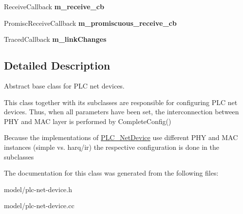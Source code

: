 \begin{DoxyCompactItemize}
\item 
\hypertarget{classns3_1_1PLC__NetDevice_a75e3b812861262923c0214944909b6ca}{\-Receive\-Callback {\bfseries m\-\_\-receive\-\_\-cb}}\label{classns3_1_1PLC__NetDevice_a75e3b812861262923c0214944909b6ca}

\item 
\hypertarget{classns3_1_1PLC__NetDevice_a52a324c2aa527f46d85fbfa461429f0e}{\-Promisc\-Receive\-Callback {\bfseries m\-\_\-promiscuous\-\_\-receive\-\_\-cb}}\label{classns3_1_1PLC__NetDevice_a52a324c2aa527f46d85fbfa461429f0e}

\item 
\hypertarget{classns3_1_1PLC__NetDevice_a4a6969b2c70fe6dc7c865990a6546d25}{\-Traced\-Callback {\bfseries m\-\_\-link\-Changes}}\label{classns3_1_1PLC__NetDevice_a4a6969b2c70fe6dc7c865990a6546d25}

\end{DoxyCompactItemize}


\subsection{\-Detailed \-Description}
\-Abstract base class for \-P\-L\-C net devices. 

\-This class together with its subclasses are responsible for configuring \-P\-L\-C net devices. \-Thus, when all parameters have been set, the interconnection between \-P\-H\-Y and \-M\-A\-C layer is performed by \-Complete\-Config()

\-Because the implementations of \hyperlink{classns3_1_1PLC__NetDevice}{\-P\-L\-C\-\_\-\-Net\-Device} use different \-P\-H\-Y and \-M\-A\-C instances (simple vs. harq/ir) the respective configuration is done in the subclasses 

\-The documentation for this class was generated from the following files\-:\begin{DoxyCompactItemize}
\item 
model/plc-\/net-\/device.\-h\item 
model/plc-\/net-\/device.\-cc\end{DoxyCompactItemize}

